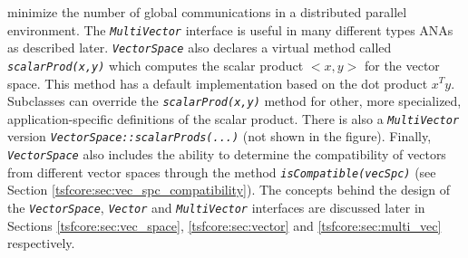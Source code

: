 minimize the number of global communications in a distributed parallel
environment.  The {}\texttt{\textit{Multi\-Vector}} interface is
useful in many different types ANAs as described
later. {}\texttt{\textit{VectorSpace}} also declares a virtual method
called {}\texttt{\textit{scalarProd(x,y)}} which computes the scalar
product $<x,y>$ for the vector space. This method has a default
implementation based on the dot product $x^T y$.  Subclasses can
override the {}\texttt{\textit{scalarProd(x,y)}} method for other,
more specialized, application-specific definitions of the scalar
product. There is also a {}\texttt{\textit{Multi\-Vector}} version
{}\texttt{\textit{VectorSpace\-::scalarProds(...)}} (not shown in the
figure).  Finally, {}\texttt{\textit{VectorSpace}} also includes the
ability to determine the compatibility of vectors from different
vector spaces through the method
{}\texttt{\textit{isCompatible(vecSpc)}} (see Section
{}\ref{tsfcore:sec:vec_spc_compatibility}).  The concepts behind the
design of the {}\texttt{\textit{VectorSpace}},
{}\texttt{\textit{Vector}} and {}\texttt{\textit{Multi\-Vector}}
interfaces are discussed later in Sections
{}\ref{tsfcore:sec:vec_space}, {}\ref{tsfcore:sec:vector} and
{}\ref{tsfcore:sec:multi_vec} respectively.

